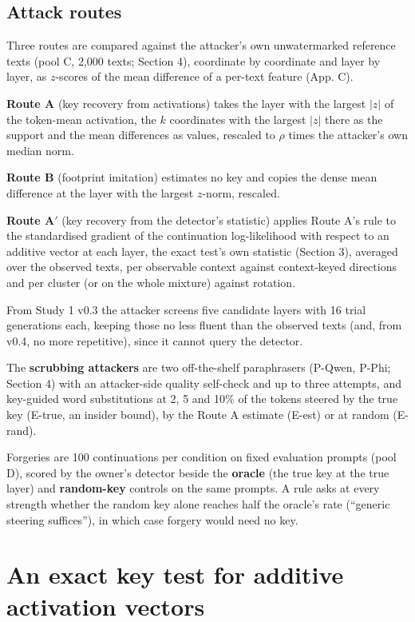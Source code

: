 \documentclass[11pt,letterpaper]{article}
\begin{document}
\hypertarget{attack-routes}{%
\subsection{Attack routes}\label{attack-routes}}

Three routes are compared against the attacker's own unwatermarked reference texts (pool C, 2,000 texts; Section 4), coordinate by coordinate and layer by layer, as \(z\)-scores of the mean difference of a per-text feature (App. C).

\textbf{Route A} (key recovery from activations) takes the layer with the largest \(|z|\) of the token-mean activation, the \(k\) coordinates with the largest \(|z|\) there as the support and the mean differences as values, rescaled to \(\rho\) times the attacker's own median norm.

\textbf{Route B} (footprint imitation) estimates no key and copies the dense mean difference at the layer with the largest \(z\)-norm, rescaled.

\textbf{Route A\ensuremath{'}} (key recovery from the detector's statistic) applies Route A's rule to the standardised gradient of the continuation log-likelihood with respect to an additive vector at each layer, the exact test's own statistic (Section 3), averaged over the observed texts, per observable context against context-keyed directions and per cluster (or on the whole mixture) against rotation.

From Study 1 v0.3 the attacker screens five candidate layers with 16 trial generations each, keeping those no less fluent than the observed texts (and, from v0.4, no more repetitive), since it cannot query the detector.

The \textbf{scrubbing attackers} are two off-the-shelf paraphrasers (P-Qwen, P-Phi; Section 4) with an attacker-side quality self-check and up to three attempts, and key-guided word substitutions at 2, 5 and 10\% of the tokens steered by the true key (E-true, an insider bound), by the Route A estimate (E-est) or at random (E-rand).

Forgeries are 100 continuations per condition on fixed evaluation prompts (pool D), scored by the owner's detector beside the \textbf{oracle} (the true key at the true layer) and \textbf{random-key} controls on the same prompts. A rule asks at every strength whether the random key alone reaches half the oracle's rate (``generic steering suffices''), in which case forgery would need no key.

\hypertarget{an-exact-key-test-for-additive-activation-vectors}{%
\section{An exact key test for additive activation vectors}\label{an-exact-key-test-for-additive-activation-vectors}}
\end{document}
